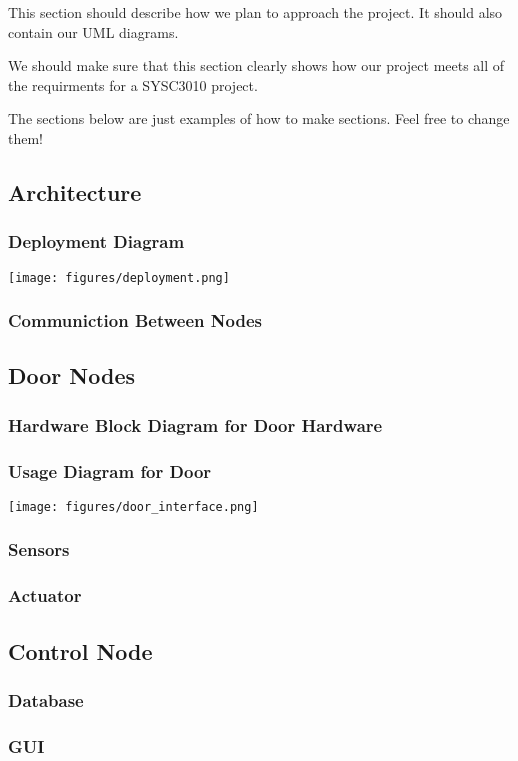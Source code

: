 This section should describe how we plan to approach the project. It should also
contain our UML diagrams. 

We should make sure that this section clearly shows how our project meets all of
the requirments for a SYSC3010 project.

The sections below are just examples of how to make sections. Feel free to
change them!

\subsection{Architecture}

\subsubsection{Deployment Diagram}

\texttt{[image: figures/deployment.png]}

\subsubsection{Communiction Between Nodes}

\subsection{Door Nodes}

\subsubsection{Hardware Block Diagram for Door Hardware}

\subsubsection{Usage Diagram for Door}

\texttt{[image: figures/door\_interface.png]}

\subsubsection{Sensors}

\subsubsection{Actuator}

\subsection{Control Node}

\subsubsection{Database}

\subsubsection{GUI}


